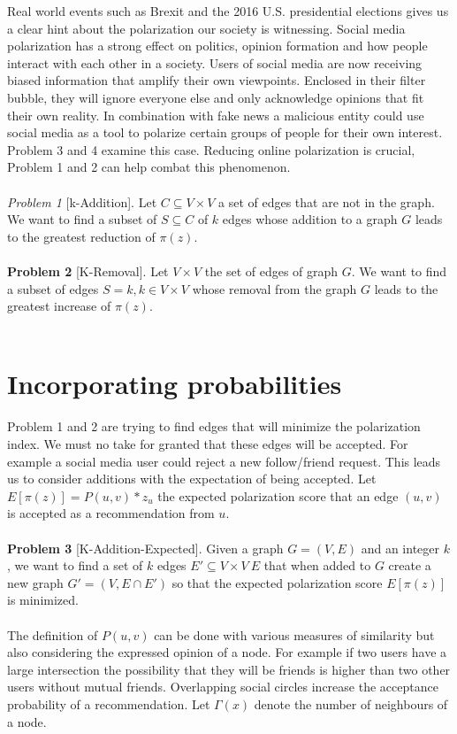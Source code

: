 Real world events such as Brexit and the 2016 U.S. presidential elections gives us a clear hint about the polarization our society is witnessing. Social media polarization has a strong effect on politics, opinion formation and how people interact with each other in a society. Users of social media are now receiving biased information that amplify their own viewpoints. Enclosed in their filter bubble, they will ignore everyone else and only acknowledge opinions that fit their own reality. In combination with fake news a malicious entity could use social media as a tool to polarize certain groups of people for their own interest. Problem 3 and 4 examine this case. Reducing online polarization is crucial, Problem 1 and 2 can help combat this phenomenon.
\\
\\
\textit{Problem 1} [k-Addition]. Let $C \subseteq	V \times V$ a set of edges that are not in the graph. We want to find a subset of $S \subseteq C$ of $k$ edges whose addition to a graph $G$ leads to the greatest reduction of $\pi(z)$.
\\
\\
\textbf{Problem 2} [K-Removal]. Let $V \times V$ the set of edges of graph $G$. We want to find a subset of edges $S = k, k \in V \times V$   whose removal from the graph $G$ leads to the greatest increase of $\pi(z)$.
\\
\\

\section{Incorporating probabilities}
\label{sec:probs}

Problem 1 and 2 are trying to find edges that will minimize the polarization index. We must no take for granted that these edges will be accepted. For example a social media user could reject a new follow/friend request. This leads us to consider additions with the expectation of being accepted. Let $E[\pi(z)] = P(u, v) * z_u$ the expected polarization score that an edge $(u, v)$ is accepted as a recommendation from $u$.
\\
\\
\textbf{Problem 3} [K-Addition-Expected]. Given a graph $G=(V,E)$ and an integer $k$, we want to find a set of $k$ edges $E′ \subseteq V×V \ E$ that when added to $G$ create a new graph $G' = (V,E \cap E')$ so that the expected polarization score $E[\pi(z)]$ is minimized.
\\
\\
The definition of $P(u, v)$ can be done with various measures of similarity but also considering the expressed opinion of a node. For example if two users have a large intersection the possibility that they will be friends is higher than two other users without mutual friends. Overlapping social circles increase the acceptance probability of a recommendation. Let $\Gamma(x)$ denote the number of neighbours of a node.
\\

